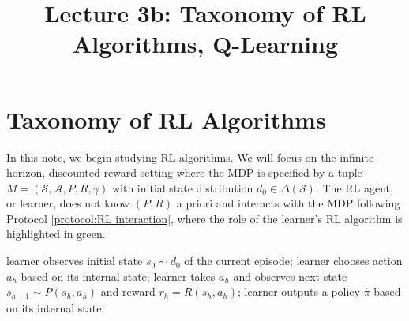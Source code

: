 \title{Lecture 3b: Taxonomy of RL Algorithms, Q-Learning}


\section{Taxonomy of RL Algorithms}
In this note, we begin studying RL algorithms.
We will focus on the infinite-horizon, discounted-reward setting where the MDP is specified by a tuple $M=(\mathcal{S},\mathcal{A},P,R,\gamma)$ with initial state distribution $d_0\in\Delta(\mathcal{S})$.
The RL agent, or learner, does not know $(P,R)$ a priori and interacts with the MDP following Protocol \ref{protocol:RL interaction}, where the role of the learner's RL algorithm is highlighted in {\color{OliveGreen} green.}
\begin{protocol}
\caption{RL interaction (infinite-horizon)} \label{protocol:RL interaction}
\begin{algorithmic}[1]
    \State learner observes initial state $s_0\sim d_0$ of the current episode; 
     
        \State learner chooses action $a_h$ {\color{OliveGreen} based on its internal state};
        \label{protocol:RL interaction:line:choose action}
        \State learner takes $a_h$ and  observes next state $s_{h+1}\sim P(s_h,a_h)$ and reward $r_h=R(s_h,a_h)$;
        \label{protocol:RL interaction:line:update internal state}
    \EndFor
{}
\State learner outputs a policy $\widehat{\pi}$ {\color{OliveGreen} based on its internal state};
\label{protocol:RL interaction:line:final policy}
\end{algorithmic}
\end{protocol}

